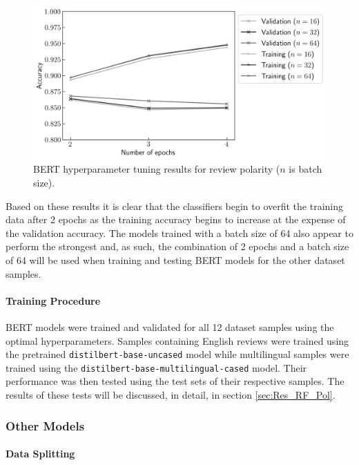 \begin{figure}[ht]
    \centering
    \includegraphics[scale=0.7]{figures/05_impl/01_rfp/01_pol/plot_hyperparams_bert.png}
    \caption{BERT hyperparameter tuning results for review polarity ($n$ is batch size).}
    \label{fig:DI_RF_Pol_BERTHP}
\end{figure}

Based on these results it is clear that the classifiers begin to overfit the training data after 2 epochs as the training accuracy begins to increase at the expense of the validation accuracy. The models trained with a batch size of 64 also appear to perform the strongest and, as such, the combination of 2 epochs and a batch size of 64 will be used when training and testing BERT models for the other dataset samples.

\paragraph{Training Procedure}

BERT models were trained and validated for all 12 dataset samples using the optimal hyperparameters. Samples containing English reviews were trained using the pretrained \texttt{distilbert-base-uncased} model while multilingual samples were trained using the \texttt{distilbert-base-multilingual-cased} model. Their performance was then tested using the test sets of their respective samples. The results of these tests will be discussed, in detail, in section \ref{sec:Res_RF_Pol}.

\subsubsection{Other Models}

\paragraph{Data Splitting}

